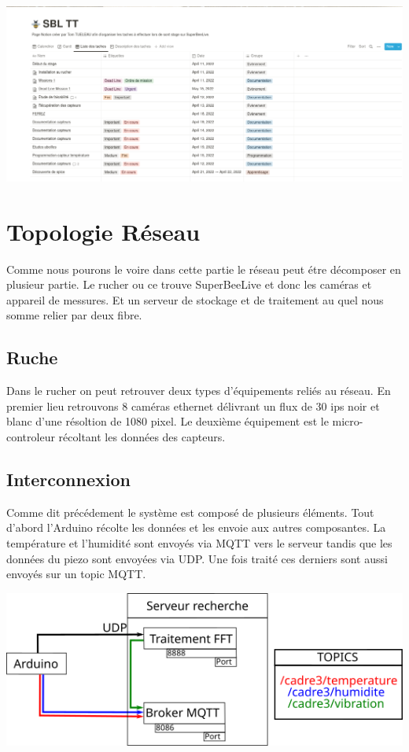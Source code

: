 \documentclass[12pt,french,a4paper]{article}
\begin{document}
\begin{center}	
\includegraphics[scale=0.35]{../img/notionlistesdestaches.png}
\label{Liste des taches}
\end{center}
\newpage

\section{Topologie Réseau}
Comme nous pourons le voire dans cette partie le réseau peut étre décomposer en plusieur partie. Le rucher ou ce trouve SuperBeeLive et donc les caméras et appareil de messures. Et un serveur de stockage et de traitement au quel nous somme relier par deux fibre. 
\subsection{Ruche}
Dans le rucher on peut retrouver deux types d'équipements reliés au réseau. En premier lieu retrouvons 8 caméras ethernet délivrant un flux de 30 ips noir et blanc d'une résoltion de 1080 pixel. Le deuxième équipement est le micro-controleur récoltant les données des capteurs.  
\subsection{Interconnexion}
Comme dit précédement le système est composé de plusieurs éléments. Tout d'abord l'Arduino récolte les données et les envoie aux autres composantes. La température et l'humidité sont envoyés via MQTT vers le serveur tandis que les données du piezo sont envoyées via UDP. Une fois traité ces derniers sont aussi envoyés sur un topic MQTT.

\begin{center}
    \includegraphics[scale=1]{../img/schemaNet.png}
    \label{SN}
\end{center}
\end{document}
